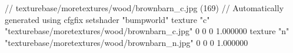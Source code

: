 // texturebase/moretextures/wood/brownbarn_c.jpg (169)
// Automatically generated using cfgfix
setshader "bumpworld"
texture "c" "texturebase/moretextures/wood/brownbarn_c.jpg" 0 0 0 1.000000
texture "n" "texturebase/moretextures/wood/brownbarn_n.jpg" 0 0 0 1.000000
